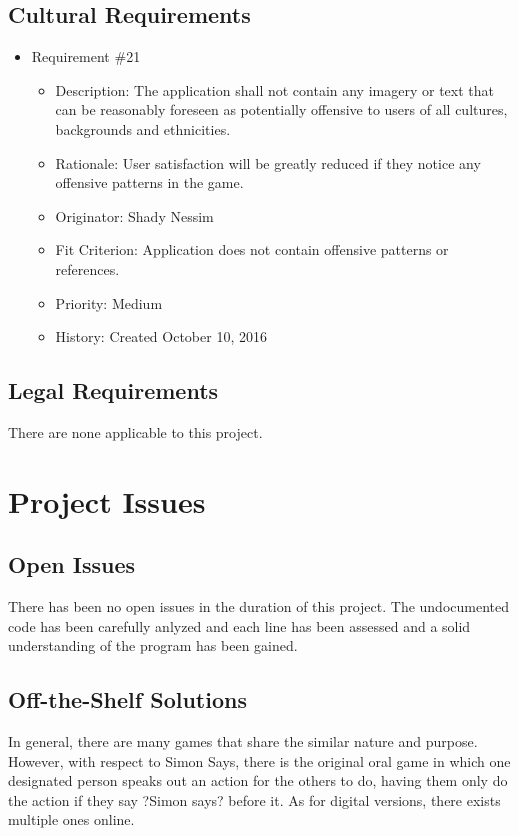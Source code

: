 \documentclass[12pt, titlepage]{article}
\begin{document}
\subsection{Cultural Requirements}
\begin{itemize}

\item Requirement \#21
\begin{itemize} 
\item Description: The application shall not contain any imagery or text that can be reasonably foreseen as potentially oﬀensive to users of all cultures, backgrounds and ethnicities. 
\item Rationale: User satisfaction will be greatly reduced if they notice any offensive patterns in the game. 
\item Originator: Shady Nessim
\item Fit Criterion: Application does not contain offensive patterns or references. 
\item Priority: Medium 
\item History: Created October 10, 2016
\end{itemize}

\end{itemize}

\subsection{Legal Requirements}
There are none applicable to this project.




\section{Project Issues}

\subsection{Open Issues}
There has been no open issues in the duration of this project. The undocumented code has been carefully anlyzed and each line has been assessed and a solid understanding of the program has been gained.

\subsection{Off-the-Shelf Solutions}
In general, there are many games that share the similar nature and purpose. However, with respect to Simon Says, there is the original oral game in which one designated person speaks out an action for the others to do, having them only do the action if they say ?Simon says? before it. As for digital versions, there exists multiple ones online.
\end{document}

